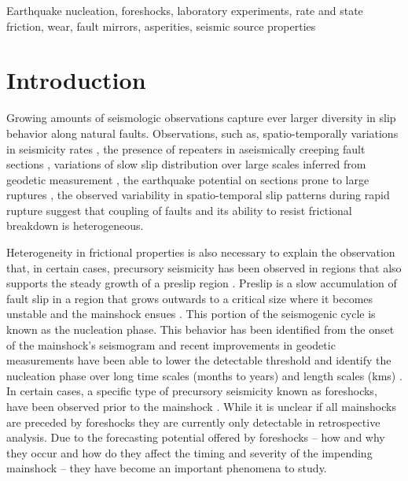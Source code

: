 \documentclass[preprint,1p, 10pt,authoryear]{elsarticle}
\begin{document}
\begin{frontmatter}
\begin{keyword}
Earthquake nucleation, foreshocks, laboratory experiments, rate and state friction, wear, fault mirrors, asperities, seismic source properties
\end{keyword}

\end{frontmatter}
\doublespacing
\linenumbers



\section{Introduction}
\label{int}
Growing amounts of seismologic observations capture ever larger diversity in slip behavior along natural faults. Observations, such as, spatio-temporally variations in seismicity rates \citep{Tormann2014, Tormann2015, Gulia2016,Gulia2019}, the presence of repeaters in aseismically creeping fault sections \citep[e.g.][]{Nadeau1994, Nadeau1999, Shirzaei2013, Uchida2019}, variations of slow slip distribution over large scales inferred from geodetic measurement  \citep[e.g.][]{Brodsky2014, Ruiz2014, Socquet2017}, the earthquake potential on sections prone to large ruptures \citep{Buergmann2000,Buergmann2004}, the observed variability in spatio-temporal slip patterns during rapid rupture \citep[e.g.][]{Mai2002, Tinti2005, Dreger2007, Galvez2016, Mai2018} suggest that coupling of faults and its ability to resist frictional breakdown is heterogeneous. 

Heterogeneity in frictional properties is also necessary to explain the observation that, in certain cases, precursory seismicity has been observed in regions that also supports the steady growth of a preslip region \citep{Kato2012, Kato2016, Obara2016, Ruiz2014, Bouchon2013,Buergmann2004}. Preslip is a slow accumulation of fault slip in a region that grows outwards to a critical size where it becomes unstable and the mainshock ensues \citep{Ohnaka1992, Ben-Zion2009}. This portion of the seismogenic cycle is known as the nucleation phase. This behavior has been identified from the onset of the mainshock's seismogram \citep{Iio1995, Ellsworth1995, Beroza1996} and recent improvements in geodetic measurements have been able to lower the detectable threshold and identify the nucleation phase over long time scales (months to years) and length scales (kms) \citep[e.g.,][]{Roeloffs2006,Ruiz2014, Socquet2017}.  In certain cases, a specific type of precursory seismicity known as foreshocks, have been observed prior to the mainshock \citep[e.g.,][]{Dodge1995, Dodge1996, Bouchon2011}. While it is unclear if all mainshocks are preceded by foreshocks \citep{Brodsky2014, Mignan2014, Seif2018} they are currently only detectable in retrospective analysis. Due to the forecasting potential offered by foreshocks -- how and why they occur and how do they affect the timing and severity of the impending mainshock -- they have become an important phenomena to study.
\end{document}
